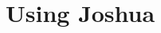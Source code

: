 \documentclass{pbml}
\begin{document}
% 
% 
% 
% 
% 
% 
% 
% 
% 
% 
% 
% 
% 


\section{Using Joshua}
\label{using-joshua}
\end{document}
